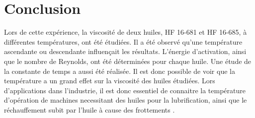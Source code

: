 \section{Conclusion}

Lors de cette expérience, la viscosité de deux huiles, HF 16-681 et HF 16-685, à différentes températures, ont été étudiées. Il a été observé qu'une température ascendante ou descendante influençait les résultats. L'énergie d'activation, ainsi que le nombre de Reynolds, ont été déterminées pour chaque huile. Une étude de la constante de temps a aussi été réalisée. Il est donc possible de voir que la température a un grand effet sur la viscosité des huiles étudiées. Lors d'applications dans l'industrie, il est donc essentiel de connaitre la température d'opération de machines necessitant des huiles pour la lubrification, ainsi que le réchauffement subit par l'huile à cause des frottements \cite{lubrifiant_uwu}.
